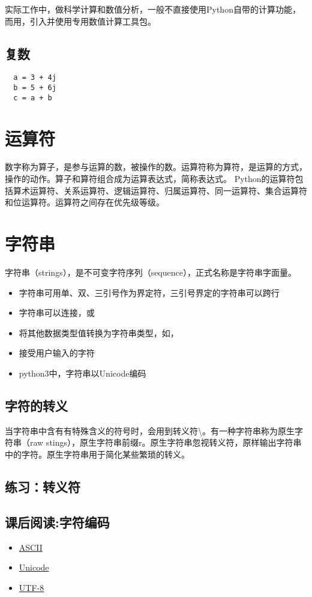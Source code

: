 实际工作中，做科学计算和数值分析，一般不直接使用Python自带的计算功能，而用，引入并使用专用数值计算工具包。
\subsection{复数}
\begin{framed}
\begin{verbatim}
  a = 3 + 4j
  b = 5 + 6j
  c = a + b
\end{verbatim}
\end{framed}
\section{运算符}
数字称为算子，是参与运算的数，被操作的数。运算符称为算符，是运算的方式，操作的动作。算子和算符组合成为运算表达式，简称表达式。
Python的运算符包括算术运算符、关系运算符、逻辑运算符、归属运算符、同一运算符、集合运算符和位运算符。运算符之间存在优先级等级。
\section{字符串}
字符串（strings），是不可变字符序列（sequence），正式名称是字符串字面量。
\begin{itemize}
\item 字符串可用单、双、三引号作为界定符，三引号界定的字符串可以跨行
\item 字符串可以连接，或
\item {}将其他数据类型值转换为字符串类型，如，
\item {}接受用户输入的字符
\item  python3中，字符串以Unicode编码
\end{itemize}
\subsection{字符的转义}
当字符串中含有有特殊含义的符号时，会用到转义符\textbackslash。有一种字符串称为原生字符串（raw stings），原生字符串前缀r。原生字符串忽视转义符，原样输出字符串中的字符。原生字符串用于简化某些繁琐的转义。
\subsection{练习：转义符}
\subsection{课后阅读:字符编码}
\begin{itemize}
\item \href{https://en.wikipedia.org/wiki/ASCII}{ASCII}
\item \href{https://www.unicode.org/standard/WhatIsUnicode.html}{Unicode}
\item \href{https://en.wikipedia.org/wiki/UTF-8}{UTF-8}
\end{itemize}

